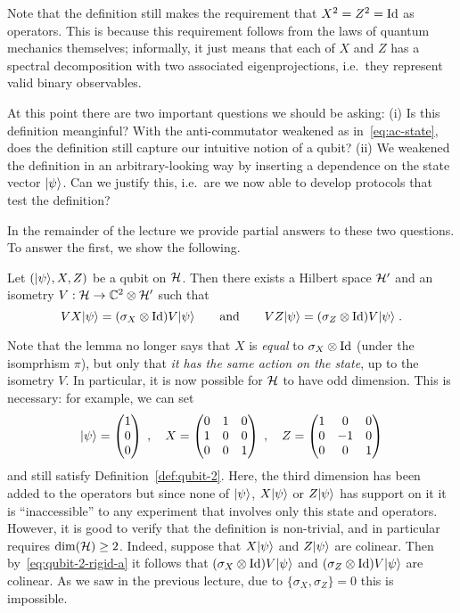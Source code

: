 Note that the definition still makes the requirement that  $X^2=Z^2=\mathop{\rm Id}\nolimits$ as operators. This is because this requirement follows from the laws of quantum mechanics themselves; informally, it just means that each of $X$ and $Z$ has a spectral decomposition with two associated eigenprojections, i.e.\ they represent valid binary observables. 

At this point there are two important questions we should be asking: (i) Is this definition meanginful? With the anti-commutator weakened as in~\eqref{eq:ac-state}, does the definition still capture our intuitive notion of a qubit? (ii) We weakened the definition in an arbitrary-looking way by inserting a dependence on the state vector $|\psi\rangle$. Can we justify this, i.e.\ are we now able to develop protocols that test the definition? 

In the remainder of the lecture we provide partial answers to these two questions. To answer the first, we show the following. 

\begin{lemma}\label{lem:qubit-2-rigid}
Let $(|\psi\rangle,X,Z)$  be a qubit on $\mathcal{H}$. Then there exists a Hilbert space $\mathcal{H}'$ and an isometry $V: \mathcal{H}\to  \mathbb{C}^2 \otimes \mathcal{H}'$  such that 
\begin{equation}\label{eq:qubit-2-rigid-a}
 V X |\psi\rangle =  (\sigma_X \otimes \mathop{\rm Id}\nolimits )V |\psi\rangle\qquad \text{and}\qquad  V Z |\psi\rangle =  (\sigma_Z \otimes \mathop{\rm Id}\nolimits )V |\psi\rangle \;.
\end{equation}
\end{lemma}

Note that the lemma no longer says that $X$ is \emph{equal} to $\sigma_X \otimes \mathop{\rm Id}\nolimits$ (under the isomprhism $\pi$), but only that \emph{it has the same action on the state}, up to the isometry $V$. In particular, it is now possible for $\mathcal{H}$ to have odd dimension. This is necessary: for example, we can set
\[ |\psi\rangle = \begin{pmatrix} 1 \\ 0 \\ 0 \end{pmatrix}\;,\quad X = \begin{pmatrix} 0 & 1 & 0 \\ 1 & 0 & 0 \\ 0 & 0 & 1 \end{pmatrix}\;,\quad Z =  \begin{pmatrix} 1 & 0 & 0 \\ 0 & -1 & 0 \\ 0 & 0 & 1 \end{pmatrix}\]
and still satisfy Definition~\ref{def:qubit-2}.  Here, the third dimension has been added to the operators but since none of $|\psi\rangle$, $X|\psi\rangle$ or $Z|\psi\rangle$ has support on it it is ``inaccessible'' to any experiment that involves only this state and operators. However, it is good to verify that the definition is non-trivial, and in particular requires $\dim(\mathcal{H})\geq 2$. Indeed, suppose that $X|\psi\rangle$ and $Z|\psi\rangle$ are colinear. Then by~\eqref{eq:qubit-2-rigid-a} it follows that $(\sigma_X\otimes \mathop{\rm Id}\nolimits)V|\psi\rangle$ and $(\sigma_Z\otimes \mathop{\rm Id}\nolimits)V|\psi\rangle$ are colinear. As we saw in the previous lecture, due to $\{\sigma_X,\sigma_Z\}=0$ this is impossible. 

